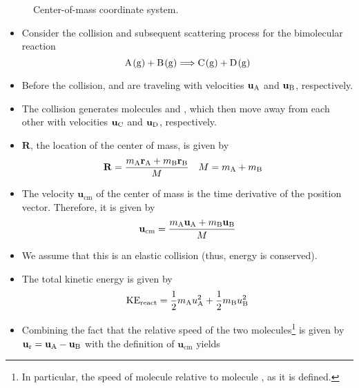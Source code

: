 \documentclass[../notes.tex]{subfiles}
\begin{document}
\begin{itemize}
\begin{figure}[h!]
        \caption{Center-of-mass coordinate system.}
        \label{fig:COMcoordinates}
    \end{figure}
    \begin{itemize}
        \item Consider the collision and subsequent scattering process for the bimolecular reaction
        \begin{equation*}
            \ce{A(g) + B(g)} \Longrightarrow \ce{C(g) + D(g)}
        \end{equation*}
        \item Before the collision,  and  are traveling with velocities $\mathbf{u}_{\ce{A}}$ and $\mathbf{u}_{\ce{B}}$, respectively.
        \item The collision generates molecules  and , which then move away from each other with velocities $\mathbf{u}_{\ce{C}}$ and $\mathbf{u}_{\ce{D}}$, respectively.
        \item $\mathbf{R}$, the location of the center of mass, is given by
        \begin{align*}
            \mathbf{R} &= \frac{m_{\ce{A}}\mathbf{r}_{\ce{A}}+m_{\ce{B}}\mathbf{r}_{\ce{B}}}{M}&
            M &= m_{\ce{A}}+m_{\ce{B}}
        \end{align*}
        \item The velocity $\mathbf{u}_\text{cm}$ of the center of mass is the time derivative of the position vector. Therefore, it is given by
        \begin{equation*}
            \mathbf{u}_\text{cm} = \frac{m_{\ce{A}}\mathbf{u}_{\ce{A}}+m_{\ce{B}}\mathbf{u}_{\ce{B}}}{M}
        \end{equation*}
        \item We assume that this is an elastic collision (thus, energy is conserved).
        \item The total kinetic energy is given by
        \begin{equation*}
            \text{KE}_\text{react} = \frac{1}{2}m_{\ce{A}}u_{\ce{A}}^2+\frac{1}{2}m_{\ce{B}}u_{\ce{B}}^2
        \end{equation*}
        \item Combining the fact that the relative speed of the two molecules\footnote{In particular, the speed of molecule  relative to molecule , as it is defined.} is given by $\mathbf{u}_\text{r}=\mathbf{u}_{\ce{A}}-\mathbf{u}_{\ce{B}}$ with the definition of $\mathbf{u}_\text{cm}$ yields

\end{itemize}
\end{itemize}
\end{document}
